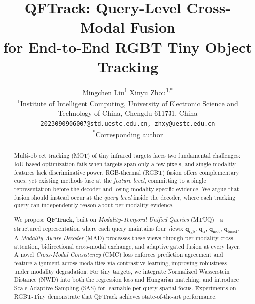 \documentclass[10pt,twocolumn,letterpaper]{article}
\begin{document}
\title{QFTrack: Query-Level Cross-Modal Fusion\\for End-to-End RGBT Tiny Object Tracking}
\author{Mingchen Liu\textsuperscript{1} \quad Xinyu Zhou\textsuperscript{1,*}\\[0.3em]
\textsuperscript{1}Institute of Intelligent Computing, University of Electronic Science and Technology of China, Chengdu 611731, China\\[0.2em]
{\tt\small 2023090906007@std.uestc.edu.cn, zhxy@uestc.edu.cn}\\[0.2em]
{\small \textsuperscript{*}Corresponding author}
}
\maketitle

\begin{abstract}
Multi-object tracking (MOT) of tiny infrared targets faces two fundamental challenges: IoU-based optimization fails when targets span only a few pixels, and single-modality features lack discriminative power.
RGB-thermal (RGBT) fusion offers complementary cues, yet existing methods fuse at the \textit{feature level}, committing to a single representation before the decoder and losing modality-specific evidence.
We argue that fusion should instead occur at the \textit{query level} inside the decoder, where each tracking query can independently reason about per-modality evidence.

We propose \textbf{QFTrack}, built on \textit{Modality-Temporal Unified Queries} (MTUQ)---a structured representation where each query maintains four views: $\mathbf{q}_\text{rgb}$, $\mathbf{q}_\text{ir}$, $\mathbf{q}_\text{mot}$, $\mathbf{q}_\text{fused}$.
A \textit{Modality-Aware Decoder} (MAD) processes these views through per-modality cross-attention, bidirectional cross-modal exchange, and adaptive gated fusion at every layer.
A novel \textit{Cross-Modal Consistency} (CMC) loss enforces prediction agreement and feature alignment across modalities via contrastive learning, improving robustness under modality degradation.
For tiny targets, we integrate Normalized Wasserstein Distance (NWD) into both the regression loss and Hungarian matching, and introduce Scale-Adaptive Sampling (SAS) for learnable per-query spatial focus.
Experiments on RGBT-Tiny demonstrate that QFTrack achieves state-of-the-art performance.
\end{abstract}

\end{document}
